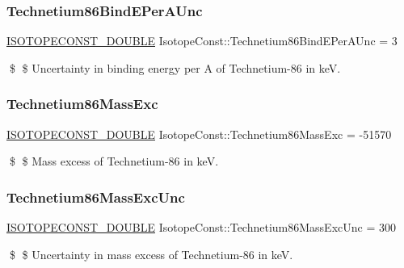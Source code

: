 \subsubsection{\texorpdfstring{Technetium86\+Bind\+E\+Per\+A\+Unc}{Technetium86BindEPerAUnc}}
{\footnotesize\ttfamily \mbox{\hyperlink{group___isotope_const-_macros_ga8f45a7272ce02c0b4c65c44636ed719a}{I\+S\+O\+T\+O\+P\+E\+C\+O\+N\+S\+T\+\_\+\+D\+O\+U\+B\+LE}} Isotope\+Const\+::\+Technetium86\+Bind\+E\+Per\+A\+Unc = 3}

\$ \$ Uncertainty in binding energy per A of Technetium-\/86 in keV. \mbox{\label{group___isotope_const-_technetium-_tc86_gad5c389dee7cd313a925cd682a673c6d1}} 
\subsubsection{\texorpdfstring{Technetium86\+Mass\+Exc}{Technetium86MassExc}}
{\footnotesize\ttfamily \mbox{\hyperlink{group___isotope_const-_macros_ga8f45a7272ce02c0b4c65c44636ed719a}{I\+S\+O\+T\+O\+P\+E\+C\+O\+N\+S\+T\+\_\+\+D\+O\+U\+B\+LE}} Isotope\+Const\+::\+Technetium86\+Mass\+Exc = -\/51570}

\$ \$ Mass excess of Technetium-\/86 in keV. \mbox{\label{group___isotope_const-_technetium-_tc86_ga4f744dda40f4e6fe2ed035be33e9e68e}} 
\subsubsection{\texorpdfstring{Technetium86\+Mass\+Exc\+Unc}{Technetium86MassExcUnc}}
{\footnotesize\ttfamily \mbox{\hyperlink{group___isotope_const-_macros_ga8f45a7272ce02c0b4c65c44636ed719a}{I\+S\+O\+T\+O\+P\+E\+C\+O\+N\+S\+T\+\_\+\+D\+O\+U\+B\+LE}} Isotope\+Const\+::\+Technetium86\+Mass\+Exc\+Unc = 300}

\$ \$ Uncertainty in mass excess of Technetium-\/86 in keV. \mbox{\label{group___isotope_const-_technetium-_tc86_ga3d2ca57cf614d3f9e0380f6ca72da209}} 
